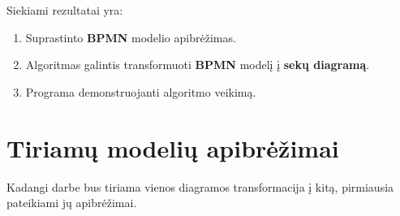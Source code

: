 \documentclass{VUMIFInfBakalaurinis}
\begin{document}
Siekiami rezultatai yra:
\begin{enumerate}
	\item Suprastinto \textbf{BPMN} modelio apibrėžimas.
	\item Algoritmas galintis transformuoti \textbf{BPMN} modelį į \textbf{sekų diagramą}.
	\item Programa demonstruojanti algoritmo veikimą.
\end{enumerate}


\section{Tiriamų modelių apibrėžimai}
Kadangi darbe bus tiriama vienos diagramos transformacija į kitą, pirmiausia pateikiami jų apibrėžimai.

\end{document}
